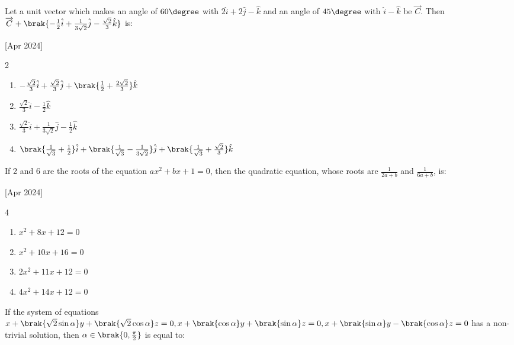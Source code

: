     \item Let a unit vector which makes an angle of $60\degree$ with $2\hat{i}+2\hat{j}-\hat{k}$ and an angle of $45\degree$ with $\hat{i}-\hat{k}$ be $\overrightarrow{C}$. Then $\overrightarrow{C}+\brak{-\frac{1}{2}\hat{i}+\frac{1}{3\sqrt{2}}\hat{j}-\frac{\sqrt{2}}{3}\hat{k}}$ is:
    
    \hfill{[Apr 2024]}

        \begin{multicols}{2}
            \begin{enumerate}
                \item $-\frac{\sqrt{2}}{3}\hat{i}+\frac{\sqrt{2}}{3}\hat{j}+\brak{\frac{1}{2}+\frac{2\sqrt{2}}{3}}\hat{k}$
                \item $\frac{\sqrt{2}}{3}\hat{i}-\frac{1}{2}\hat{k}$
                \item $\frac{\sqrt{2}}{3}\hat{i}+\frac{1}{3\sqrt{2}}\hat{j}-\frac{1}{2}\hat{k}$
                \item $\brak{\frac{1}{\sqrt{3}}+\frac{1}{2}}\hat{i}+\brak{\frac{1}{\sqrt{3}}-\frac{1}{3\sqrt{2}}}\hat{j}+\brak{\frac{1}{\sqrt{3}}+\frac{\sqrt{2}}{3}}\hat{k}$ 
            \end{enumerate}
        \end{multicols}
        
    \item If 2 and 6 are the roots of the equation $ax^2+bx+1=0$, then the quadratic equation, whose roots are $\frac{1}{2a+b}$ and $\frac{1}{6a+b}$, is:
    
    \hfill{[Apr 2024]}

        \begin{multicols}{4}
            \begin{enumerate}
                \item $x^2+8x+12=0$
                \item $x^2+10x+16=0$
                \item $2x^2+11x+12=0$
                \item $4x^2+14x+12=0$
            \end{enumerate}
        \end{multicols}

    \item If the system of equations $x+\brak{\sqrt{2}\sin\alpha}y+\brak{\sqrt{2}\cos\alpha}z=0, x+\brak{\cos\alpha}y+\brak{\sin\alpha}z=0, x+\brak{\sin\alpha}y-\brak{\cos\alpha}z=0$ has a non-trivial solution, then $\alpha\in\brak{0,\frac{\pi}{2}}$ is equal to:
    
